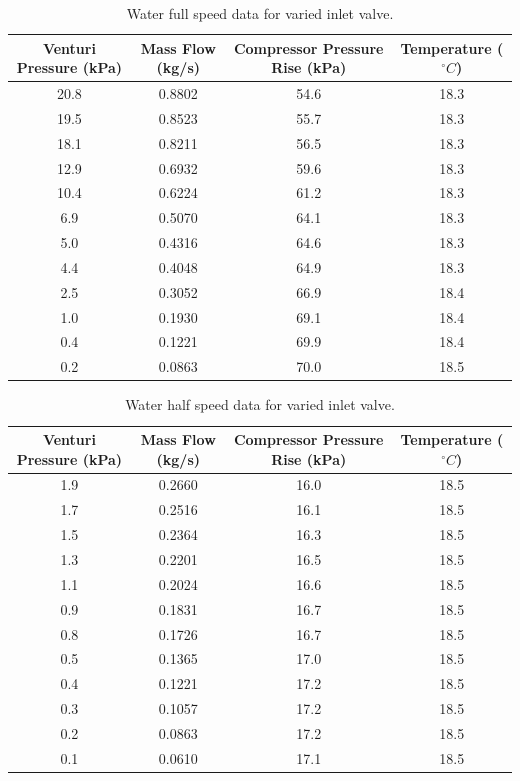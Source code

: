 \documentclass{article}
\begin{document}
\begin{table}[H]
    \centering
    \begin{tabular}{cccc}
        \hline
        Venturi Pressure (kPa) & Mass Flow (kg/s) & Compressor Pressure Rise (kPa) & Temperature ($^\circ C$)\\        \hline
        20.8 & 0.8802 & 54.6 & 18.3 \\
        19.5 & 0.8523 & 55.7 & 18.3 \\
        18.1 & 0.8211 & 56.5 & 18.3 \\
        12.9 & 0.6932 & 59.6 & 18.3 \\
        10.4 & 0.6224 & 61.2 & 18.3 \\
        6.9 & 0.5070 & 64.1 & 18.3 \\
        5.0 & 0.4316 & 64.6 & 18.3 \\
        4.4 & 0.4048 & 64.9 & 18.3 \\
        2.5 & 0.3052 & 66.9 & 18.4 \\
        1.0 & 0.1930 & 69.1 & 18.4 \\
        0.4 & 0.1221 & 69.9 & 18.4 \\
        0.2 & 0.0863 & 70.0 & 18.5 \\
        \hline
    \end{tabular}
    \caption{Water full speed data for varied inlet valve.}
    \label{tab:water_full_speed_inlet_data}
\end{table}

\begin{table}[H]
    \centering
    \begin{tabular}{cccc}
        \hline
        Venturi Pressure (kPa) & Mass Flow (kg/s) & Compressor Pressure Rise (kPa) & Temperature ($^\circ C$)\\        \hline
        1.9 & 0.2660 & 16.0 & 18.5 \\
        1.7 & 0.2516 & 16.1 & 18.5 \\
        1.5 & 0.2364 & 16.3 & 18.5 \\
        1.3 & 0.2201 & 16.5 & 18.5 \\
        1.1 & 0.2024 & 16.6 & 18.5 \\
        0.9 & 0.1831 & 16.7 & 18.5 \\
        0.8 & 0.1726 & 16.7 & 18.5 \\
        0.5 & 0.1365 & 17.0 & 18.5 \\
        0.4 & 0.1221 & 17.2 & 18.5 \\
        0.3 & 0.1057 & 17.2 & 18.5 \\
        0.2 & 0.0863 & 17.2 & 18.5 \\
        0.1 & 0.0610 & 17.1 & 18.5 \\
        \hline
    \end{tabular}
    \caption{Water half speed data for varied inlet valve.}
    \label{tab:water_half_speed_inlet_data}
\end{table}
\end{document}
